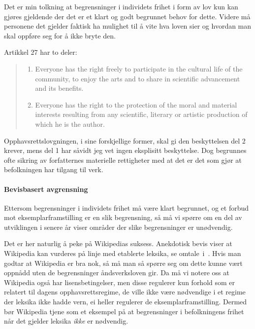 \documentclass[11pt,norsk,a4paper]{article}
\begin{document}
Det er min tolkning at begrensninger i individets frihet i form av lov
kun kan gjøres gjeldende der det er et klart og godt begrunnet behov
for dette. Videre må personene det gjelder faktisk ha mulighet til å
vite hva loven sier og hvordan man skal oppføre seg for å ikke bryte
den.

Artikkel 27 har to deler:
\begin{quote}
\begin{enumerate}
\item Everyone has the right freely to participate in the cultural
  life of the community, to enjoy the arts and to share in scientific
  advancement and its benefits.

\item Everyone has the right to the protection of the moral and
  material interests resulting from any scientific, literary or
  artistic production of which he is the author.
\end{enumerate}
\end{quote}

Opphavsrettslovgningen, i sine forskjellige former, skal gi den
beskyttelsen del 2 krever, mens del 1 har såvidt jeg vet ingen
eksplisitt beskyttelse. Dog begrunnes ofte sikring av forfatternes
materielle rettigheter med at det er det som gjør at befolkningen har
tilgang til verk.

\paragraph{Bevisbasert avgrensning}

Ettersom begrensninger i individets frihet må være klart begrunnet, og
et forbud mot eksemplarframstilling er en slik begrensning, så må vi
spørre om en del av utviklingen i senere år viser områder der slike
begrensninger er unødvendig.

Det er her naturlig å peke på Wikipedias suksess. Anekdotisk bevis
viser at Wikipedia kan vurderes på linje med etablerte leksika, se
omtale~i~\cite{naturewiki}. Hvis man godtar at Wikipedia er bra nok,
så må man så spørre seg om dette kunne vært oppnådd uten de
begrensninger åndsverksloven gir. Da må vi notere oss at Wikipedia
også har lisensbetingelser, men disse regulerer kun forhold som er
relatert til dagens opphavsrettsregime, de ville ikke være nødvendige
i et regime der leksika ikke hadde vern, ei heller regulerer de
eksemplarframstilling. Dermed bør Wikipedia tjene som et eksempel på
at begrensninger i befolkningens frihet når det gjelder leksika
\emph{ikke} er nødvendig.
\end{document}
